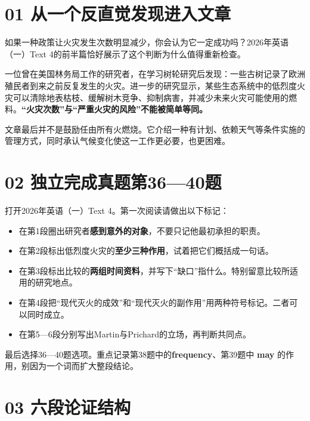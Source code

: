 \documentclass[a4paper,11pt,openany]{report}
\providecommand{\tightlist}{\setlength{\itemsep}{1pt}\setlength{\parskip}{0pt}}
\begin{document}
\section{01 从一个反直觉发现进入文章}\label{ux4eceux4e00ux4e2aux53cdux76f4ux89c9ux53d1ux73b0ux8fdbux5165ux6587ux7ae0}

如果一种政策让火灾发生次数明显减少，你会认为它一定成功吗？2026年英语（一）Text 4的前半篇恰好展示了这个判断为什么值得重新检查。

一位曾在美国林务局工作的研究者，在学习树轮研究后发现：一些古树记录了欧洲殖民者到来之前反复发生的火灾。进一步的研究显示，某些生态系统中的低烈度火灾可以清除地表枯枝、缓解树木竞争、抑制病害，并减少未来火灾可能使用的燃料。\textbf{``火灾次数''与``严重火灾的风险''不能被简单等同。}

文章最后并不是鼓励任由所有火燃烧。它介绍一种有计划、依赖天气等条件实施的管理方式，同时承认气候变化使这一工作更必要，也更困难。

\section{02 独立完成真题第36---40题}\label{ux72ecux7acbux5b8cux6210ux771fux9898ux7b2c3640ux9898}

打开2026年英语（一）Text 4。第一次阅读请做出以下标记：

\begin{itemize}
\tightlist
\item
  在第1段圈出研究者\textbf{感到意外的对象}，不要只记他最初承担的职责。
\item
  在第2段标出低烈度火灾的\textbf{至少三种作用}，试着把它们概括成一句话。
\item
  在第3段标出比较的\textbf{两组时间资料}，并写下``缺口''指什么。特别留意比较所适用的研究地点。
\item
  在第4段把``现代灭火的成效''和``现代灭火的副作用''用两种符号标记。二者可以同时成立。
\item
  在第5---6段分别写出Martin与Prichard的立场，再判断共同点。
\end{itemize}

最后选择36---40题选项。重点记录第38题中的\textbf{frequency}、第39题中 \textbf{may} 的作用，别因为一个词而扩大整段结论。

\section{03 六段论证结构}\label{ux516dux6bb5ux8bbaux8bc1ux7ed3ux6784}
\end{document}
